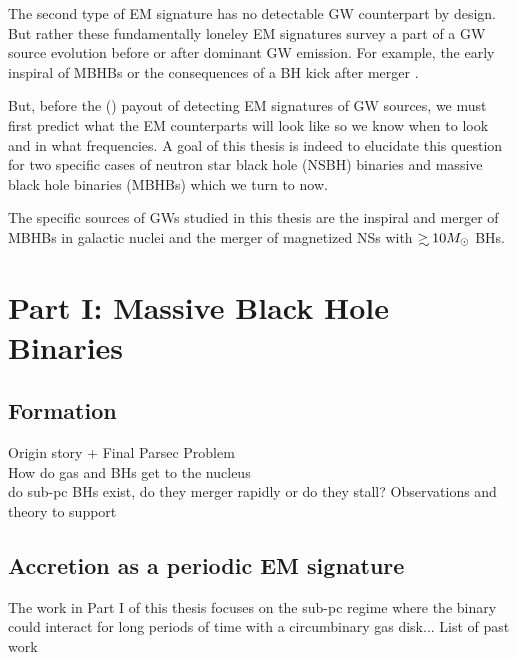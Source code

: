 The second type of EM signature has no detectable GW counterpart by design.
But rather these fundamentally loneley EM signatures survey a part of a GW source evolution before or after dominant GW emission. For example, the early inspiral of MBHBs \citep{Haiman looking for inspiralling MBHBs} or the consequences of a BH kick after merger \citep{BHkicks}.




But, before the () payout of detecting EM signatures of GW sources, we must first predict what the EM counterparts will look like so we know
when to look and in what frequencies. A goal of this thesis is indeed to
elucidate this question for two specific cases of neutron star black hole
(NSBH) binaries and massive black hole binaries (MBHBs) which we turn to now. 

 



The specific sources of GWs studied in this thesis are the inspiral and merger
of MBHBs in galactic nuclei and the merger of magnetized NSs with $\gsim 10
\Msun$ BHs.

\section{Part I: Massive Black Hole Binaries}
\subsection{Formation}
Origin story + Final Parsec Problem\\
How do gas and BHs get to the nucleus\\
do sub-pc BHs exist, do they merger rapidly or do they stall?
Observations and theory to support

\subsection{Accretion as a periodic EM signature}
The work in Part I of this thesis focuses on the sub-pc regime where the binary could interact for long periods of time with a circumbinary gas disk...
List of past work\\

